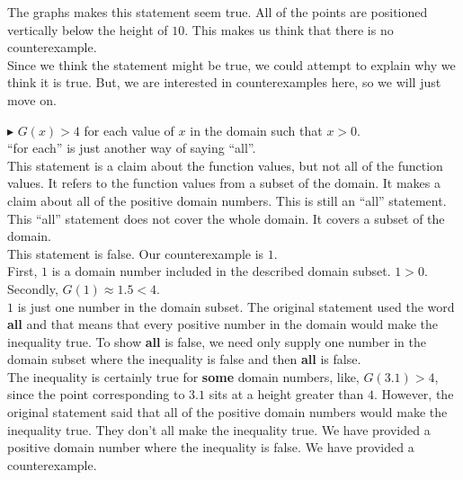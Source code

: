 \documentclass{ximera}
\begin{document}
The graphs makes this statement seem true.  All of the points are positioned vertically below the height of $10$.  This makes us think that there is no counterexample.  \\

Since we think the statement might be true, we could attempt to explain why we think it is true.  But, we are interested in counterexamples here, so we will just move on.















\textbf{\textcolor{red!90!darkgray}{$\blacktriangleright$}} $G(x) > 4$ for each value of $x$ in the domain such that $x > 0$. \\



``for each'' is just another way of saying ``all''.\\

This statement is a claim about the function values, but not all of the function values.  It refers to the function values from a subset of the domain.  It makes a claim about all of the positive domain numbers. This is still an ``all'' statement.  This ``all'' statement does not cover the whole domain.  It covers a subset of the domain.\\



This statement is false. Our counterexample is $1$.  \\


First, $1$ is a domain number included in the described domain subset.  $1 > 0$. \\


Secondly, $G(1) \approx 1.5 < 4$. \\



$1$ is just one number in the domain subset.   The original statement used the word \textbf{all} and that means that every positive number in the domain would make the inequality true.  To show \textbf{all} is false, we need only supply one number in the domain subset where the inequality is false and then \textbf{all} is false. \\

The inequality is certainly true for \textbf{some} domain numbers, like, $G(3.1) > 4$, since the point corresponding to $3.1$ sits at a height greater than $4$.  However, the original statement said that all of the positive domain numbers would make the inequality true. They don't all make the inequality true.  We have provided a positive domain number where the inequality is false. We have provided a counterexample. \\
\end{document}
